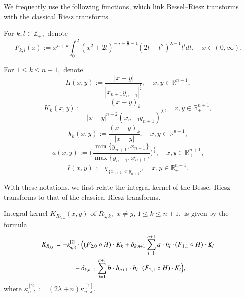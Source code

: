 \documentclass[12pt]{amsart}
\begin{document}
We frequently use the following functions, which link Bessel--Riesz transforms with the classical Riesz transforms.
\begin{nota}\label{fkl notation} For $k,l\in\mathbb{Z}_+,$ denote
$$F_{k,l}(x):=x^{n+k}\int_0^2(x^2+2t)^{-\lambda-\frac{n}{2}-1}(2t-t^2)^{\lambda-1}t^ldt,\quad x\in(0,\infty).$$	
\end{nota}
\begin{nota} For $1\leq k\leq n+1,$ denote
$$H(x,y):=\frac{|x-y|}{|x_{n+1}y_{n+1}|^{\frac12}},\quad x,y\in\mathbb{R}^{n+1},$$
$$K_k(x,y):=\frac{(x-y)_k}{|x-y|^{n+2}(x_{n+1}y_{n+1})^{\lambda}},\quad x,y\in\mathbb{R}^{n+1}_+,$$	
$$h_k(x,y):=\frac{(x-y)_k}{|x-y|},\quad x,y\in\mathbb{R}^{n+1},$$
$$a(x,y):=\bigg(\frac{\min\{y_{n+1},x_{n+1}\}}{\max\{y_{n+1},x_{n+1}\}}\bigg)^{\frac12},\quad x,y\in\mathbb{R}^{n+1}_+,$$
$$b(x,y):=\chi_{\{x_{n+1}<y_{n+1}\}},\quad x,y\in\mathbb{R}^{n+1}_+.$$
\end{nota}
With these notations, we first relate the integral kernel of the Bessel--Riesz transforms to that of the classical Riesz transforms.
\begin{lemma}\label{Bessel--Riesz kernel representation lemma} Integral kernel $K_{R_{\lambda,k}}(x,y)$ of $R_{\lambda,k},$ $x\neq y$, $1\leq k\leq n+1,$ is given by the formula
\begin{align*}
K_{R_{\lambda,k}}&=-\kappa^{[2]}_{n,\lambda}\cdot\Big((F_{2,0}\circ H)\cdot K_k+\delta_{k,n+1}\sum_{l=1}^{n+1}a\cdot h_l\cdot (F_{1,1}\circ H)\cdot K_l\\
&\hspace{1.0cm}-\delta_{k,n+1}\sum_{l=1}^{n+1}b\cdot h_{n+1}\cdot h_l\cdot (F_{2,1}\circ H)\cdot K_l\Big),\nonumber
\end{align*}
where {\color{red}}$\kappa^{[2]}_{n,\lambda}:=(2\lambda+n)\kappa^{[1]}_{n,\lambda}.$
\end{lemma}
\end{document}

